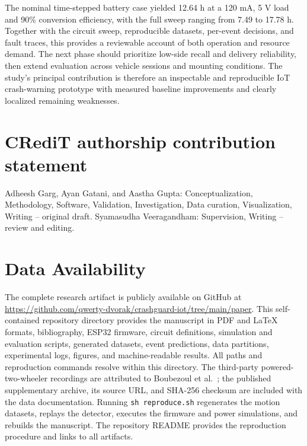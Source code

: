 \documentclass[10pt,a4paper]{article}
\begin{document}
The nominal time-stepped battery case yielded 12.64 h at a 120 mA, 5 V load and 90\% conversion efficiency, with the full sweep ranging from 7.49 to 17.78 h. Together with the circuit sweep, reproducible datasets, per-event decisions, and fault traces, this provides a reviewable account of both operation and resource demand. The next phase should prioritize low-side recall and delivery reliability, then extend evaluation across vehicle sessions and mounting conditions. The study's principal contribution is therefore an inspectable and reproducible IoT crash-warning prototype with measured baseline improvements and clearly localized remaining weaknesses.

\section*{CRediT authorship contribution statement}
Adheesh Garg, Ayan Gatani, and Aastha Gupta: Conceptualization, Methodology, Software, Validation, Investigation, Data curation, Visualization, Writing -- original draft. Syamasudha Veeragandham: Supervision, Writing -- review and editing.

\section*{Data Availability}
The complete research artifact is publicly available on GitHub at \url{https://github.com/qwerty-dvorak/crashguard-iot/tree/main/paper}. This self-contained repository directory provides the manuscript in PDF and LaTeX formats, bibliography, ESP32 firmware, circuit definitions, simulation and evaluation scripts, generated datasets, event predictions, data partitions, experimental logs, figures, and machine-readable results. All paths and reproduction commands resolve within this directory. The third-party powered-two-wheeler recordings are attributed to Boubezoul et al.~\cite{boubezoul2019dataset}; the published supplementary archive, its source URL, and SHA-256 checksum are included with the data documentation. Running \texttt{sh reproduce.sh} regenerates the motion datasets, replays the detector, executes the firmware and power simulations, and rebuilds the manuscript. The repository README provides the reproduction procedure and links to all artifacts.


\end{document}
